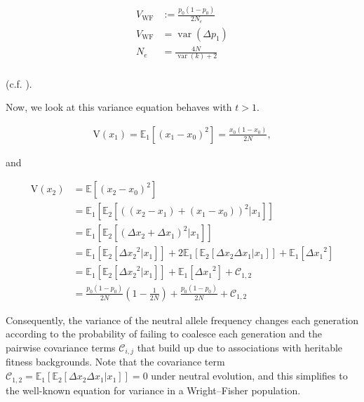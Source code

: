 \documentclass[11pt]{article}
\newcommand{\E}{\mathbb{E}}
\newcommand{\V}{\text{V}}
\DeclareMathOperator{\var}{var}
\begin{document}
\begin{align}
  V_\text{WF} &:= \frac{p_0(1-p_0)}{2N_e} \\
  V_\text{WF} &= \var(\Delta p_1) \\
  N_e &= \frac{4N}{\var(k) + 2} \\
\end{align}

(c.f. \cite{Wright1938-tv}).

Now, we look at this variance equation behaves with $t > 1$. 

\begin{align}
  \V(x_1) = \E_1\left[(x_1 - x_0)^2\right]= \frac{x_0(1-x_0)}{2N},
\end{align}

and

\begin{align}
  \label{eq:var_wf}
  \V(x_2) &= \E\left[(x_2 - x_0)^2\right] \\
          &= \E_1\left[\E_2\left[((x_2-x_1) + (x_1 - x_0))^2 | x_1\right]\right] \\
          &= \E_1\left[\E_2\left[(\Delta x_2 + \Delta x_1)^2 | x_1\right]\right] \\
          &= \E_1\left[\E_2\left[{\Delta x_2}^2|x_1\right]\right] + 2\E_1\left[\E_2[\Delta x_2 \Delta x_1 | x_1]\right] + \E_1\left[ {\Delta x_1}^2\right] \\
          &= \E_1\left[\E_2\left[{\Delta x_2}^2|x_1\right]\right] + \E_1\left[ {\Delta x_1}^2\right] + \mathcal{C}_{1,2} \\
          &= \frac{p_0(1-p_0)}{2N}\left(1 - \frac{1}{2N}\right) + \frac{p_0(1-p_0)}{2N} + \mathcal{C}_{1,2}
\end{align}

Consequently, the variance of the neutral allele frequency changes each
generation according to the probability of failing to coalesce each generation
and the pairwise covariance terms $\mathcal{C}_{i,j}$ that build up due to associations
with heritable fitness backgrounds. Note that the covariance term $\mathcal{C}_{1,2} =
\E_1\left[\E_2[\Delta x_2 \Delta x_1 | x_1]\right] = 0$ under neutral
evolution, and this simplifies to the well-known equation for variance in a
Wright--Fisher population.
\end{document}
